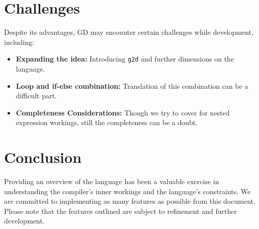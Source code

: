 \documentclass{article}
\begin{document}
\section{Challenges}
Despite its advantages, GD may encounter certain challenges while development, including:

\begin{itemize}
    \item \textbf{Expanding the idea:} Introducing \texttt{g2d} and further dimensions on the language.

    \item \textbf{Loop and if-else combination:} Translation of this combination can be a difficult part.

    \item \textbf{Completeness Considerations:} Though we try to cover for nested expression workings, still the completeness can be a doubt.

\end{itemize}

\section{Conclusion}
Providing an overview of the language has been a valuable exercise in understanding the compiler's inner workings and the language's constraints. We are committed to implementing as many features as possible from this document. Please note that the features outlined are subject to refinement and further development.
\end{document}
